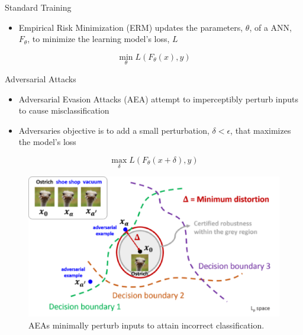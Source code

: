 \documentclass{beamer}
\begin{document}

\begin{frame}{Standard Training}
	
	\begin{itemize}
		\item Empirical Risk Minimization (ERM) updates the parameters, $\theta$, of a ANN, $F_\theta$, to minimize the learning model's loss, $L$
	\end{itemize}

	$$\min_{\theta} L(F_\theta(x), y)$$
	
\end{frame}



\begin{frame}{Adversarial Attacks}
	
	\begin{itemize}
		\item Adversarial Evasion Attacks (AEA) attempt to imperceptibly perturb inputs to cause misclassification
		\item Adversaries objective is to add a small perturbation, $\delta < \epsilon$, that maximizes the model's loss
	\end{itemize}

	$$\max_{\delta} L(F_\theta(x+\delta), y)$$
	
\end{frame}



\begin{frame}{}
	
	\begin{figure}
		\centering
		\includegraphics[scale=.7]{./images/adversarial_attack.png}
		\caption{AEAs minimally perturb inputs to attain incorrect classification.}
	\end{figure}
	
\end{frame}
\end{document}
